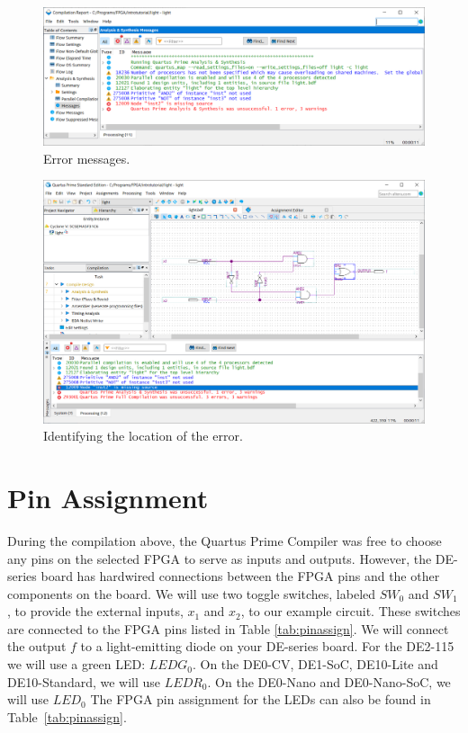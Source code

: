 \documentclass[11pt, twoside, pdftex]{article}
\begin{document}
\begin{figure}[H]
   \begin{center}
      \includegraphics[scale=0.5]{figures/figure22.png}
   \caption{Error messages.} 
	 \label{fig:22}
	 \end{center}
\end{figure}

\begin{figure}[H]
   \begin{center}
      \includegraphics[scale=0.45]{figures/figure23.png}
   \caption{Identifying the location of the error.} 
	 \label{fig:23}
	 \end{center}
\end{figure}

\newpage
\section{Pin Assignment}

During the compilation above, the Quartus Prime Compiler was free to choose any
pins on the selected FPGA to serve as inputs and outputs. However, the DE-series board
has hardwired connections between the FPGA pins and the other components on the board.
We will use two toggle switches, labeled $SW_0$ and $SW_1$, to provide the
external inputs, $x_1$ and $x_2$, to our example circuit. These switches are connected
to the FPGA pins listed in Table \ref{tab:pinassign}. We will connect the output $f$ to a
light-emitting diode on your DE-series board. For the DE2-115 we will use a green LED: $LEDG_0$.
On the DE0-CV, DE1-SoC, DE10-Lite and DE10-Standard, we will use $LEDR_0$. On the DE0-Nano and DE0-Nano-SoC, we will use $LED_0$
The FPGA pin assignment for the LEDs can also be found in Table~\ref{tab:pinassign}.
\end{document}
